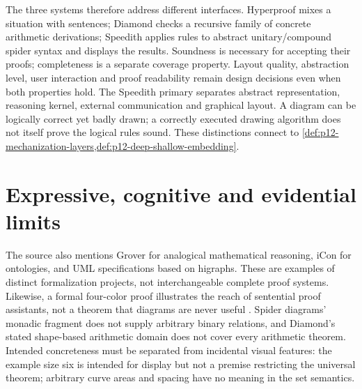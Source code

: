 The three systems therefore address different interfaces. Hyperproof
mixes a situation with sentences; Diamond checks a recursive family
of concrete arithmetic derivations; Speedith applies rules to abstract
unitary/compound spider syntax and displays the results. Soundness is
necessary for accepting their proofs; completeness is a separate
coverage property. Layout quality, abstraction level, user interaction
and proof readability remain design decisions even when both properties
hold. The Speedith primary separates abstract representation, reasoning
kernel, external communication and graphical layout. A diagram can be
logically correct yet badly drawn; a correctly executed drawing algorithm
does not itself prove the logical rules sound. These distinctions connect
to \cref{def:p12-mechanization-layers,def:p12-deep-shallow-embedding}.

\section{Expressive, cognitive and evidential limits}

The source also mentions Grover for analogical mathematical reasoning,
iCon for ontologies, and UML specifications based on higraphs. These are
examples of distinct formalization projects, not interchangeable complete
proof systems. Likewise, a formal four-color proof illustrates the reach
of sentential proof assistants, not a theorem that diagrams are never
useful \cite[pp.~718,722]{Jamnik2021LogicalDiagrams}.
Spider diagrams' monadic fragment does not supply arbitrary binary
relations, and Diamond's stated shape-based arithmetic domain does not
cover every arithmetic theorem. Intended concreteness must be separated
from incidental visual features: the example size six is intended for
display but not a premise restricting the universal theorem; arbitrary
curve areas and spacing have no meaning in the set semantics.


